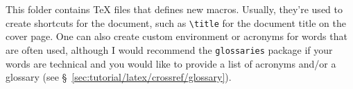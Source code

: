 This folder contains \TeX{} files that defines new \glspl{macro}. Usually, they're used to create shortcuts for the document, such as \texttt{\textbackslash{}title} for the document title on the cover page. One can also create custom \gls{environment} or acronyms for words that are often used, although I would recommend the \texttt{glossaries} package if your words are technical and you would like to provide a list of acronyms and/or a glossary (see \S~\ref{sec:tutorial/latex/crossref/glossary}).